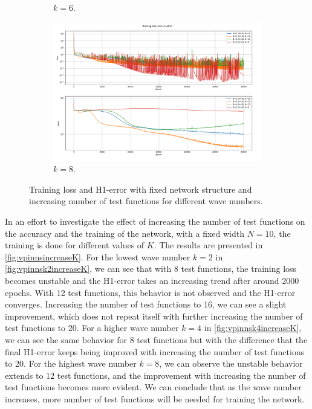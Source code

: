 \begin{figure}[h!]
\begin{subfigure}[b]{0.48\textwidth}
        \caption{$k=6$.}
        \label{fig:vpinnsk6increaseK}
    \end{subfigure}
    \hfill
    \begin{subfigure}[b]{0.48\textwidth}
        \includegraphics[width=\textwidth]{img/VPINN-Comparison-k8increaseK.png}
        \caption{$k=8$.}
        \label{fig:vpinnsk8increaseK}
    \end{subfigure}
    \caption{Training loss and H1-error with fixed network structure and increasing number of test functions for different wave numbers.}
    \label{fig:vpinnsincreaseK}
\end{figure}

In an effort to investigate the effect of increasing the number of test functions on the accuracy and the training of the network, with a fixed width $N=10$, the training is done for different values of $K$. The results are presented in \autoref{fig:vpinnsincreaseK}. For the lowest wave number $k=2$ in \autoref{fig:vpinnsk2increaseK}, we can see that with 8 test functions, the training loss becomes unstable and the H1-error takes an increasing trend after around 2000 epochs. With 12 test functions, this behavior is not observed and the H1-error converges. Increasing the number of test functions to 16, we can see a slight improvement, which does not repeat itself with further increasing the number of test functions to 20. For a higher wave number $k=4$ in \autoref{fig:vpinnsk4increaseK}, we can see the same behavior for 8 test functions but with the difference that the final H1-error keeps being improved with increasing the number of test functions to 20. For the highest wave number $k=8$, we can observe the unstable behavior extends to 12 test functions, and the improvement with increasing the number of test functions becomes more evident. We can conclude that as the wave number increases, more number of test functions will be needed for training the network.


